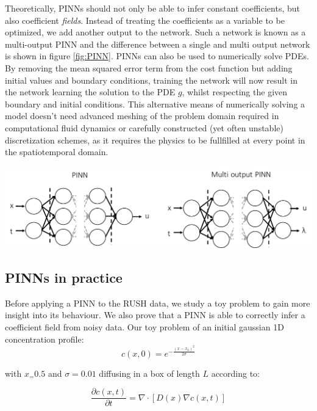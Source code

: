 \documentclass{Dissertate}
\let\origfigure\figure
\let\endorigfigure\endfigure
\renewenvironment{figure}[1][2] {
    \expandafter\origfigure\expandafter[H]
} {
    \endorigfigure
}
\begin{document}
Theoretically, PINNs should not only be able to infer constant
coefficients, but also coefficient \emph{fields}. Instead of treating
the coefficients as a variable to be optimized, we add another output to
the network. Such a network is known as a multi-output PINN and the
difference between a single and multi output network is shown in figure
\ref{fig:PINN}. PINNs can also be used to numerically solve PDEs.
By removing the mean squared error term from the cost function but
adding initial values and boundary conditions, training the network will
now result in the network learning the solution to the PDE \(g\), whilst
respecting the given boundary and initial conditions. This alternative
means of numerically solving a model doesn't need advanced meshing of
the problem domain required in computational fluid dynamics or carefully
constructed (yet often unstable) discretization schemes, as it requires
the physics to be fullfilled at every point in the spatiotemporal
domain.

\begin{figure}
\hypertarget{fig:PINN}{%
\centering
\includegraphics{source/figures/pdf/PINN.pdf}
\caption{\textbf{Left panel:} a single output PINN. \textbf{Right
panel:} A multi-output PINN. The network now also predicts the
coefficients values at each data point.}\label{fig:PINN}
}
\end{figure}

\hypertarget{pinns-in-practice}{%
\subsection{PINNs in practice}\label{pinns-in-practice}}

Before applying a PINN to the RUSH data, we study a toy problem to gain
more insight into its behaviour. We also prove that a PINN is able to
correctly infer a coefficient field from noisy data. Our toy problem of
an initial gaussian 1D concentration profile: \[
c(x, 0) = e^{-\frac{(x-x_0)^2}{2\sigma}}
\]

with \(x_ = 0.5\) and \(\sigma =0.01\) diffusing in a box of length
\(L\) according to:

\begin{equation}
\frac{\partial c(x,t)}{\partial t} = \nabla \cdot[D(x)\nabla c(x,t)]
\label{eq:toyproblem}\end{equation}
\end{document}

